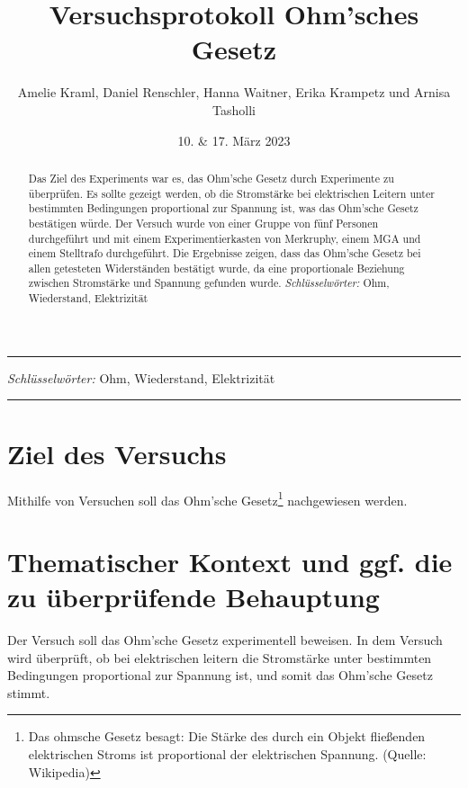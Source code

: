 \documentclass[10pt]{article}
\title{Versuchsprotokoll Ohm'sches Gesetz}
\author{Amelie Kraml, Daniel Renschler, Hanna Waitner, Erika Krampetz und Arnisa Tasholli}
\date{10. \& 17. März 2023}
\begin{document}
\maketitle

\begin{center}
\begin{minipage}{0.9\textwidth}
\begin{center}
\rule{1\textwidth}{1pt}
\begin{abstract}
Das Ziel des Experiments war es, das Ohm'sche Gesetz durch Experimente zu überprüfen. Es sollte gezeigt werden, ob die Stromstärke bei elektrischen Leitern unter bestimmten Bedingungen proportional zur Spannung ist, was das Ohm'sche Gesetz bestätigen würde. Der Versuch wurde von einer Gruppe von fünf Personen durchgeführt und mit einem Experimentierkasten von Merkruphy, einem MGA und einem Stelltrafo durchgeführt. Die Ergebnisse zeigen, dass das Ohm'sche Gesetz bei allen getesteten Widerständen bestätigt wurde, da eine proportionale Beziehung zwischen Stromstärke und Spannung gefunden wurde.
\textit{Schlüsselwörter: }\textsf{Ohm, Wiederstand, Elektrizität}
\end{abstract}
\end{center}
\vspace{0.1cm}
\end{minipage}
\end{center}
\vspace{-.5cm}
\hspace{1.5cm}\textit{Schlüsselwörter: }\textsf{Ohm, Wiederstand, Elektrizität}
\vspace{-.2cm}
\begin{center}
\rule{.9\textwidth}{1pt}
\end{center}

\section{Ziel des Versuchs}
Mithilfe von Versuchen soll das Ohm'sche Gesetz\footnote{Das ohmsche Gesetz besagt: Die Stärke des durch ein Objekt fließenden elektrischen Stroms ist proportional der elektrischen Spannung. (Quelle: Wikipedia)} nachgewiesen werden. 


\section{Thematischer Kontext und ggf. die zu überprüfende Behauptung}
Der Versuch soll das Ohm'sche Gesetz experimentell beweisen.
In dem Versuch wird überprüft, ob bei elektrischen leitern die Stromstärke unter bestimmten Bedingungen proportional zur Spannung ist, und somit das Ohm'sche Gesetz stimmt. 
\end{document}

